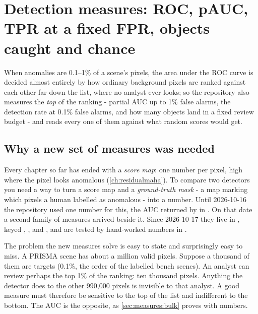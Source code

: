 \chapter{Detection measures: ROC, pAUC, TPR at a fixed FPR, objects caught and chance}\label{ch:measures}

\begin{onething}
When anomalies are 0.1--1\% of a scene's pixels, the area under the ROC curve is decided almost entirely by how
ordinary background pixels are ranked against each other far down the list, where no analyst ever looks; so the
repository also measures the \emph{top} of the ranking - partial AUC up to 1\% false alarms, the detection rate at
0.1\% false alarms, and how many objects land in a fixed review budget - and reads every one of them against what
random scores would get.
\end{onething}

\section{Why a new set of measures was needed}\label{sec:measures:why}

Every chapter so far has ended with a \emph{score map}: one number per pixel, high where the pixel looks
anomalous (\cref{ch:residualmaha}). To compare two detectors you need a way to turn a score map and a
\emph{ground-truth mask} - a map marking which pixels a human labelled as anomalous - into a
number. Until 2026-10-16 the repository used one number for this, the AUC returned by
 in . On that date a second family of measures
arrived beside it. Since 2026-10-17 they live in , keyed ,
,  and , and are tested by hand-worked numbers in
.

The problem the new measures solve is easy to state and surprisingly easy to miss. A PRISMA scene has about a
million valid pixels. Suppose a thousand of them are targets\tagA{} (0.1\%, the order of the labelled bench
scenes). An analyst can review perhaps the top 1\% of the ranking: ten thousand pixels. Anything the detector does
to the other 990,000 pixels is invisible to that analyst. A good measure must therefore be sensitive to the top of
the list and indifferent to the bottom. The AUC is the opposite, as \cref{sec:measures:bulk} proves with numbers.

